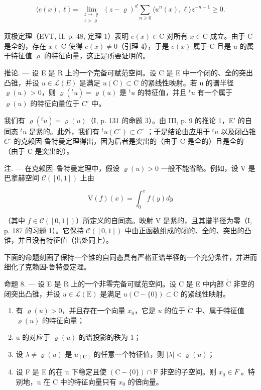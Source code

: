 \[
\langle e(x),\ell \rangle = \lim_{\substack{z\to \varrho \\ z > \varrho}}(z - \varrho)^{d}\sum_{n\geqslant 0}\langle u^{n}(x),\ell \rangle z^{-n - 1}\geqslant 0.
\]

双极定理（EVT, II, p. 48, 定理 1）表明 \(e(x) \in \mathrm{C}\) 对所有 \(x \in \mathrm{C}\) 成立。由于 \(\mathrm{C}\) 是全的，存在 \(x \in \mathrm{C}\) 使得 \(e(x) \neq 0\)（引理 4），于是 \(e(x)\) 属于 \(\mathrm{C}\) 且是 \(u\) 的属于特征值 \(\varrho\) 的特征向量，这正是所要证明的。

推论. --- 设 E 是 R 上的一个完备可赋范空间。设 C 是 E 中一个闭的、全的突出凸锥，并设 \(u \in \mathcal{L}(E)\) 是满足 \(u(\mathrm{C}) \subset \mathrm{C}\) 的紧线性映射。若 u 的谱半径 \(\varrho(u)\) \textgreater{} 0，则 \(\varrho(^{t}u) = \varrho(u)\) 是 \(^{t}u\) 的特征值，并且 \(^{t}u\) 有一个属于 \(\varrho(u)\) 的特征向量位于 \(C^{\circ}\) 中。

我们有 \(\varrho(^{t}u) = \varrho(u)\)（I, p. 131 的命题 3）。由 III, p. 9 的推论 1，E' 的自同态 \(^{t}u\) 是紧的。此外，我们有 \(^{t}u(C^{\circ}) \subset C^{\circ}\) ；于是结论由应用于 \(^{t}u\) 以及闭凸锥 \(C^{\circ}\) 的克赖因-鲁特曼定理得出，因为后者是突出的（由于 C 是全的）且是全的（由于 C 是突出的）。

注. --- 在克赖因–鲁特曼定理中，假设 \(\varrho(u) > 0\) 一般不能省略。例如，设 V 是巴拿赫空间 \(\mathcal{C}([0,1])\) 上由

\[
\mathrm{V} (f) (x) = \int_ {0} ^ {x} f (y) d y
\]

（其中 \(f \in \mathcal{C}([0,1])\)）所定义的自同态。映射 V 是紧的，且其谱半径为零（I, p. 187 的习题 1）。它保持 \(\mathcal{C}([0,1])\) 中由正函数组成的闭的、全的、突出的凸锥，并且没有特征值（出处同上）。

下面的命题刻画了保持一个锥的自同态具有严格正谱半径的一个充分条件，并进而细化了克赖因-鲁特曼定理。

命题 8. --- 设 E 是 R 上的一个非零完备可赋范空间。设 C 是 E 中内部 \(\mathring{\mathrm{C}}\) 非空的闭突出凸锥，并设 \(u \in \mathcal{L}(\mathrm{E})\) 是满足 \(u(\mathrm{C} - \{0\}) \subset \mathring{\mathrm{C}}\) 的紧线性映射。

\begin{enumerate}
\def\labelenumi{\alph{enumi})}
\item
  有 \(\varrho(u) > 0\)，并且存在一个向量 \(x_0\)，它是 \(u\) 的位于 \(\mathring{C}\) 中、属于特征值 \(\varrho(u)\) 的特征向量；
\item
  u 的对应于 \(\varrho(u)\) 的谱投影的秩为 1；
\item
  设 \(\lambda \neq \varrho(u)\) 是 \(u_{(\mathbf{C})}\) 的任意一个特征值，则 \(|\lambda| < \varrho(u)\)；
\item
  设 F 是 E 的在 u 下稳定且使 \((\mathrm{C}-\{0\})\cap\mathrm{F}\) 非空的子空间。则 \(x_{0}\in F\) 。特别地，u 在 C 中的特征向量只有 \(x_{0}\) 的倍向量。
\end{enumerate}

